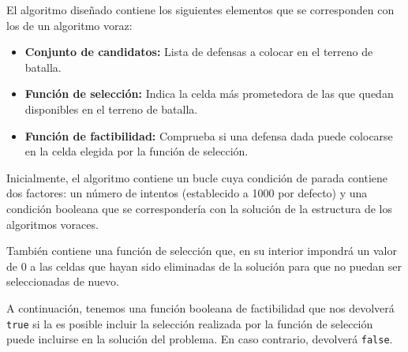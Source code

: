 El algoritmo diseñado contiene los siguientes elementos que se corresponden con los de un algoritmo voraz:
\begin{itemize}
	\item \textbf{Conjunto de candidatos:} Lista de defensas a colocar en el terreno de batalla.
	\item \textbf{Función de selección:} Indica la celda más prometedora de las que quedan disponibles en el terreno de batalla.
	\item \textbf{Función de factibilidad:} Comprueba si una defensa dada puede colocarse en la celda elegida por la función de selección.
\end{itemize}
Inicialmente, el algoritmo contiene un bucle cuya condición de parada contiene dos factores: un número de intentos (establecido a 1000 por defecto) y una condición booleana que se correspondería con la solución de la estructura de los algoritmos voraces.

También contiene una función de selección que, en su interior impondrá un valor de 0 a las celdas que hayan sido eliminadas de la solución para que no puedan ser seleccionadas de nuevo.

A continuación, tenemos una función booleana de factibilidad que nos devolverá \texttt{true} si la es posible incluir la selección realizada por la función de selección puede incluirse en la solución del problema. En caso contrario, devolverá \texttt{false}.